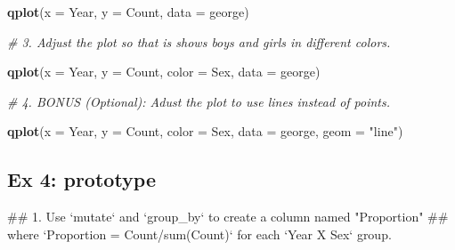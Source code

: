 \documentclass[]{book}
\newenvironment{Shaded}{\begin{snugshade}}{\end{snugshade}}
\newcommand{\KeywordTok}[1]{\textcolor[rgb]{0.13,0.29,0.53}{\textbf{#1}}}
\newcommand{\DataTypeTok}[1]{\textcolor[rgb]{0.13,0.29,0.53}{#1}}
\newcommand{\StringTok}[1]{\textcolor[rgb]{0.31,0.60,0.02}{#1}}
\newcommand{\CommentTok}[1]{\textcolor[rgb]{0.56,0.35,0.01}{\textit{#1}}}
\newcommand{\NormalTok}[1]{#1}
\begin{document}
\begin{Shaded}
\begin{Highlighting}[]
\KeywordTok{qplot}\NormalTok{(}\DataTypeTok{x =}\NormalTok{ Year, }\DataTypeTok{y =}\NormalTok{ Count, }\DataTypeTok{data =}\NormalTok{ george)}
\end{Highlighting}
\end{Shaded}

\begin{Shaded}
\begin{Highlighting}[]
\CommentTok{# 3. Adjust the plot so that is shows boys and girls in different colors.}
\end{Highlighting}
\end{Shaded}

\begin{Shaded}
\begin{Highlighting}[]
\KeywordTok{qplot}\NormalTok{(}\DataTypeTok{x =}\NormalTok{ Year, }\DataTypeTok{y =}\NormalTok{ Count, }\DataTypeTok{color =}\NormalTok{ Sex, }\DataTypeTok{data =}\NormalTok{ george)}
\end{Highlighting}
\end{Shaded}

\begin{Shaded}
\begin{Highlighting}[]
\CommentTok{# 4.  BONUS (Optional): Adust the plot to use lines instead of points.}
\end{Highlighting}
\end{Shaded}

\begin{Shaded}
\begin{Highlighting}[]
\KeywordTok{qplot}\NormalTok{(}\DataTypeTok{x =}\NormalTok{ Year, }\DataTypeTok{y =}\NormalTok{ Count, }\DataTypeTok{color =}\NormalTok{ Sex, }\DataTypeTok{data =}\NormalTok{ george, }\DataTypeTok{geom =} \StringTok{"line"}\NormalTok{)}
\end{Highlighting}
\end{Shaded}

\subsection{Ex 4: prototype}\label{ex-4-prototype}

\begin{Shaded}
\begin{Highlighting}[]
\NormalTok{## 1.  Use `mutate` and `group_by` to create a column named "Proportion"}
\NormalTok{##     where `Proportion = Count/sum(Count)` for each `Year X Sex` group.}
\end{Highlighting}
\end{Shaded}
\end{document}
